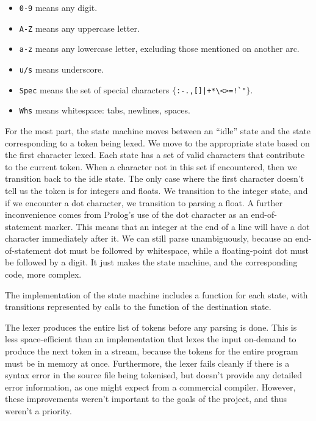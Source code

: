 \documentclass[12pt]{article}
\begin{document}
\vspace{-10px}
\begin{itemize}
\item \verb|0-9| means any digit.\vspace{-4px}
\item \verb|A-Z| means any uppercase letter.\vspace{-4px}
\item \verb|a-z| means any lowercase letter, excluding those mentioned on another arc.\vspace{-4px}
\item \verb|u/s| means underscore.\vspace{-4px}
\item \verb|Spec| means the set of special characters $\{$\verb/:-.,[]|+*\<>=!`"/$\}$.\vspace{-4px}
\item \verb|Whs| means whitespace: tabs, newlines, spaces.
\end{itemize}

\newpage

For the most part, the state machine moves between an ``idle'' state and the state corresponding to a token being lexed. 
We move to the appropriate state based on the first character lexed. 
Each state has a set of valid characters that contribute to the current token. 
When a character not in this set if encountered, then we transition back to the idle state.
The only case where the first character doesn't tell us the token is for integers and floats. 
We transition to the integer state, and if we encounter a dot character, we transition to parsing a float.
A further inconvenience comes from Prolog's use of the dot character as an end-of-statement marker. 
This means that an integer at the end of a line will have a dot character immediately after it. 
We can still parse unambiguously, because an end-of-statement dot must be followed by whitespace, while a floating-point dot must be followed by a digit. 
It just makes the state machine, and the corresponding code, more complex.

The implementation of the state machine includes a function for each state, with transitions represented by calls to the function of the destination state.

The lexer produces the entire list of tokens before any parsing is done. 
This is less space-efficient than an implementation that lexes the input on-demand to produce the next token in a stream, because the tokens for the entire program must be in memory at once. 
Furthermore, the lexer fails cleanly if there is a syntax error in the source file being tokenised, but doesn't provide any detailed error information, as one might expect from a commercial compiler. 
However, these improvements weren't important to the goals of the project, and thus weren't a priority.
\end{document}
